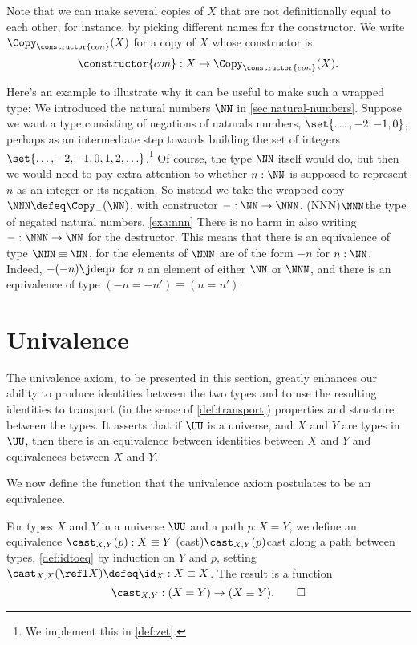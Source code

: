 Note that we can make several copies of $X$ that are not
definitionally equal to each other,
for instance, by picking different names for the constructor.
We write $\Copy_{\constructor{con}}(X)$ for a copy of $X$
whose constructor is
\[
  \constructor{con} : X \to \Copy_{\constructor{con}}(X).
\]

\begin{example}\label{exa:nnn}
Here's an example to illustrate why it can be useful to make such a wrapped type:
We introduced the natural numbers $\NN$ in \cref{sec:natural-numbers}.
Suppose we want a type consisting of negations of naturals numbers,
$\set{\ldots, -2, -1,0}$,
perhaps as an intermediate step towards building the set of integers
$\set{\ldots, -2, -1,0,1,2,\ldots}$.\footnote{%
  We implement this in \cref{def:zet}.}
Of course, the type $\NN$ itself would do,
but then we would need to pay extra attention to whether $n:\NN$
is supposed to represent $n$ as an integer or its negation.
So instead we take the wrapped copy $\NNN\defeq\Copy_{-}(\NN)$,
with constructor ${-} : \NN \to \NNN$.%
\glossary(NNN){$\protect\NNN$}{the type of negated natural numbers,
  \cref{exa:nnn}}
There is no harm in also writing ${-} : \NNN \to \NN$
for the destructor.
This means that there is an equivalence of type $\NNN \equiv \NN$, for
the elements of $\NNN$ are of the form $-n$ for $n:\NN$.
Indeed, $-(-n) \jdeq n$ for $n$ an element of either $\NN$ or $\NNN$,
and there is an equivalence of type $(-n = -n') \equiv (n=n')$.
\end{example}

\section{Univalence}\label{sec:univax}

The univalence axiom, to be presented in this section, greatly enhances our ability to produce identities between the two types and to use the
resulting identities to transport (in the sense of \cref{def:transport}) properties and structure between the types.  It asserts that if $\UU$
is a universe, and $X$ and $Y$ are types in $\UU$, then there is an equivalence between identities between $X$ and $Y$ and equivalences between
$X$ and $Y$.

We now define the function that the univalence axiom postulates to be an equivalence.

\begin{definition}\label{def:idtoeq}
  For types $X$ and $Y$ in a universe $\UU$ and a path $p : X = Y$,
  we define an equivalence $\cast_{X,Y} (p) : X\equiv Y$
  \glossary(cast){$\protect\cast_{X,Y} (p)$}{cast along a path between types, \cref{def:idtoeq}}
  by induction on $Y$ and $p$,
  setting $\cast_{X,X} (\refl X) \defeq \id_X : X \equiv X$.
  The result is a function
  \[
    \cast_{X,Y} : (X = Y) \to (X\equiv Y).\qedhere
  \]
\end{definition}

